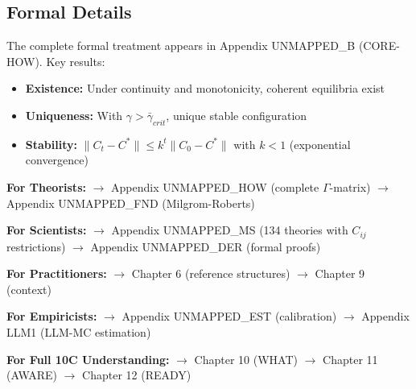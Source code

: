 \subsection{Formal Details}
\label{sec:comp-formal}

The complete formal treatment appears in Appendix UNMAPPED_B (CORE-HOW). Key results:
\begin{itemize}[nosep]
    \item \textbf{Existence:} Under continuity and monotonicity, coherent equilibria exist
    \item \textbf{Uniqueness:} With $\gamma > \bar{\gamma}_{crit}$, unique stable configuration
    \item \textbf{Stability:} $\|C_t - C^*\| \leq k^t \|C_0 - C^*\|$ with $k < 1$ (exponential convergence)
\end{itemize}

\begin{tcolorbox}[
    colback=gray!10!white,
    colframe=gray!75!black,
    title={\textbf{Reading Paths from Chapter 5}}
]
\textbf{For Theorists:}
$\rightarrow$ Appendix UNMAPPED_HOW (complete $\Gamma$-matrix) $\rightarrow$ Appendix UNMAPPED_FND (Milgrom-Roberts)

\textbf{For Scientists:}
$\rightarrow$ Appendix UNMAPPED_MS (134 theories with $C_{ij}$ restrictions) $\rightarrow$ Appendix UNMAPPED_DER (formal proofs)

\textbf{For Practitioners:}
$\rightarrow$ Chapter 6 (reference structures) $\rightarrow$ Chapter 9 (context)

\textbf{For Empiricists:}
$\rightarrow$ Appendix UNMAPPED_EST (calibration) $\rightarrow$ Appendix LLM1 (LLM-MC estimation)

\textbf{For Full 10C Understanding:}
$\rightarrow$ Chapter 10 (WHAT) $\rightarrow$ Chapter 11 (AWARE) $\rightarrow$ Chapter 12 (READY)
\end{tcolorbox}

